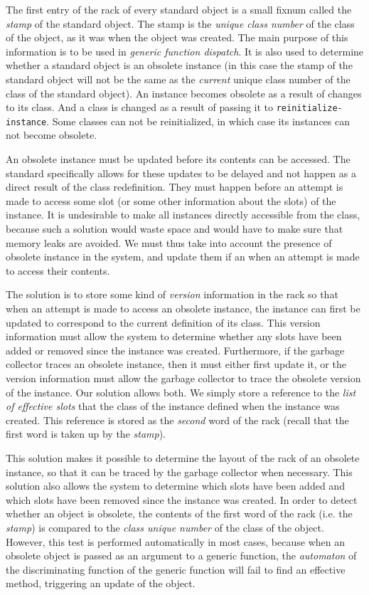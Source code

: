 The first entry of the rack of every standard object is a small fixnum
called the \emph{stamp} of the standard object.  The stamp is the
\emph{unique class number} of the class of the object, as it was when
the object was created.  The main purpose of this information is to
be used in \emph{generic function dispatch}.  It is also used to
determine whether a standard object is an obsolete instance (in this
case the stamp of the standard object will not be the same as the
\emph{current} unique class number of the class of the standard
object).  An instance becomes obsolete as a result of changes to its
class.  And a class is changed as a result of passing it to
\texttt{reinitialize-instance}.  Some classes can not be
reinitialized, in which case its instances can not become obsolete.

An obsolete instance must be updated before its contents can be
accessed.  The standard specifically allows for these updates to be
delayed and not happen as a direct result of the class redefinition.
They must happen before an attempt is made to access some slot (or
some other information about the slots) of the instance.  It is
undesirable to make all instances directly accessible from the class,
because such a solution would waste space and would have to make sure
that memory leaks are avoided.  We must thus take into account the
presence of obsolete instance in the system, and update them if an
when an attempt is made to access their contents.

The solution is to store some kind of \emph{version} information in
the rack so that when an attempt is made to access an
obsolete instance, the instance can first be updated to correspond to
the current definition of its class.  This version information must
allow the system to determine whether any slots have been added or
removed since the instance was created.  Furthermore, if the garbage
collector traces an obsolete instance, then it must either first
update it, or the version information must allow the garbage collector
to trace the obsolete version of the instance.  Our solution allows
both.  We simply store a reference to the \emph{list of effective
  slots} that the class of the instance defined when the instance was
created.  This reference is stored as the \emph{second} word of the
rack (recall that the first word is taken up by the
\emph{stamp}).

This solution makes it possible to determine the layout of the rack of
an obsolete instance, so that it can be traced by the garbage
collector when necessary.  This solution also allows the system to
determine which slots have been added and which slots have been
removed since the instance was created.  In order to detect whether an
object is obsolete, the contents of the first word of the rack
(i.e. the \emph{stamp}) is compared to the \emph{class unique number}
of the class of the object.  However, this test is performed
automatically in most cases, because when an obsolete object is passed
as an argument to a generic function, the \emph{automaton} of the
discriminating function of the generic function will fail to find an
effective method, triggering an update of the object.

